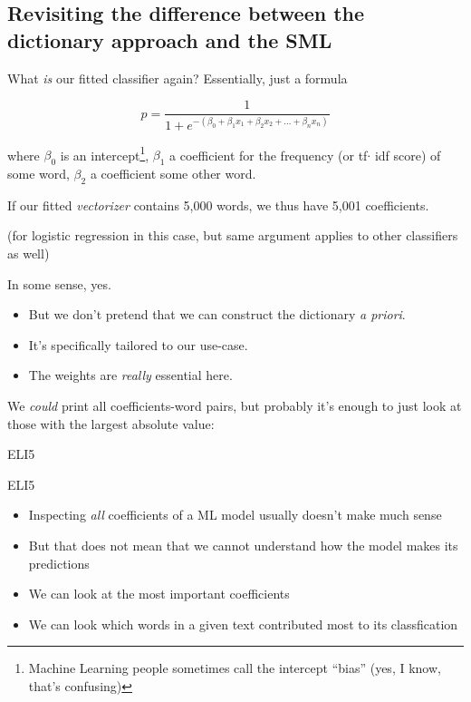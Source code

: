 \subsection{Revisiting the difference between the dictionary approach and the SML}


\begin{frame}{What \emph{is} our fitted classifier again?}
  Essentially, just a formula 
	
	$$p = \frac{1}{1 + e^{-(\beta_0 + \beta_1 x_1 + \beta_2 x_2 + \ldots + \beta_n x_n)}}$$
	
  where $\beta_0$ is an intercept\footnote{Machine Learning people sometimes call the intercept ``bias'' (yes, I know, that's confusing)}, $\beta_1$ a coefficient for the frequency (or tf$\cdot$ idf score) of some word, $\beta_2$ a coefficient some other word.
	
  If our fitted \emph{vectorizer} contains 5,000 words, we thus have 5,001 coefficients.
	
  \tiny{(for logistic regression in this case, but same argument applies to other classifiers as well)}
	
\end{frame}



\begin{frame}{In some sense, yes.}
  \begin{itemize}
  \item But we don't pretend that we can construct the dictionary \emph{a priori}.
  \item It's specifically tailored to our use-case.
  \item The weights are \emph{really} essential here.
  \end{itemize}
  
  \pause
  We \emph{could} print all coefficients-word pairs, but probably it's enough to just look at those with the largest absolute value:
\end{frame}





\begin{frame}{ELI5}
\end{frame}

\begin{frame}{ELI5}
  \begin{itemize}
  \item Inspecting \emph{all} coefficients of a ML model usually doesn't make much sense
  \item But that does not mean that we cannot understand how the model makes its predictions
  \item We can look at the most important coefficients
  \item We can look which words in a given text contributed most to its classfication
  \end{itemize}
\end{frame}




